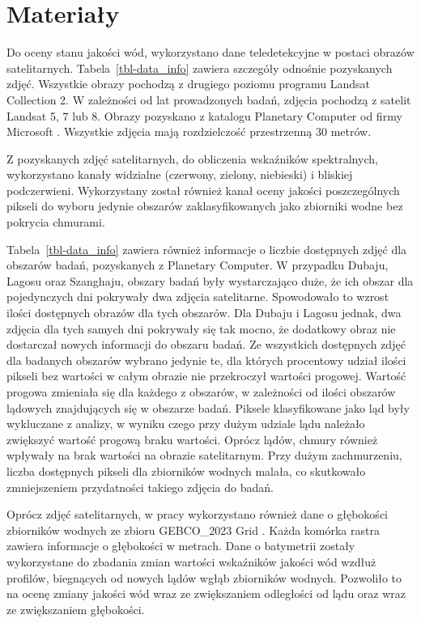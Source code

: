 \documentclass{amuthesis}
\begin{document}

\hypertarget{sec-materialy}{%
\chapter{Materiały}\label{sec-materialy}}

Do oceny stanu jakości wód, wykorzystano dane teledetekcyjne w postaci
obrazów satelitarnych. Tabela~\ref{tbl-data_info} zawiera szczegóły
odnośnie pozyskanych zdjęć. Wszystkie obrazy pochodzą z drugiego poziomu
programu Landsat Collection 2. W zależności od lat prowadzonych badań,
zdjęcia pochodzą z satelit Landsat 5, 7 lub 8. Obrazy pozyskano z
katalogu Planetary Computer od firmy Microsoft
\autocite{microsoft_open_source_2022_7261897}. Wszystkie zdjęcia mają
rozdzielczość przestrzenną 30 metrów.

Z pozyskanych zdjęć satelitarnych, do obliczenia wskaźników
spektralnych, wykorzystano kanały widzialne (czerwony, zielony,
niebieski) i bliskiej podczerwieni. Wykorzystany został również kanał
oceny jakości poszczególnych pikseli do wyboru jedynie obszarów
zaklasyfikowanych jako zbiorniki wodne bez pokrycia chmurami.

Tabela~\ref{tbl-data_info} zawiera również informacje o liczbie
dostępnych zdjęć dla obszarów badań, pozyskanych z Planetary Computer. W
przypadku Dubaju, Lagosu oraz Szanghaju, obszary badań były
wystarczająco duże, że ich obszar dla pojedynczych dni pokrywały dwa
zdjęcia satelitarne. Spowodowało to wzrost ilości dostępnych obrazów dla
tych obszarów. Dla Dubaju i Lagosu jednak, dwa zdjęcia dla tych samych
dni pokrywały się tak mocno, że dodatkowy obraz nie dostarczał nowych
informacji do obszaru badań. Ze wszystkich dostępnych zdjęć dla badanych
obszarów wybrano jedynie te, dla których procentowy udział ilości
pikseli bez wartości w całym obrazie nie przekroczył wartości progowej.
Wartość progowa zmieniała się dla każdego z obszarów, w zależności od
ilości obszarów lądowych znajdujących się w obszarze badań. Piksele
klasyfikowane jako ląd były wykluczane z analizy, w wyniku czego przy
dużym udziale lądu należało zwiększyć wartość progową braku wartości.
Oprócz lądów, chmury również wpływały na brak wartości na obrazie
satelitarnym. Przy dużym zachmurzeniu, liczba dostępnych pikseli dla
zbiorników wodnych malała, co skutkowało zmniejszeniem przydatności
takiego zdjęcia do badań.

Oprócz zdjęć satelitarnych, w pracy wykorzystano również dane o
głębokości zbiorników wodnych ze zbioru GEBCO\_2023 Grid
\autocite{gebco_2023}. Każda komórka rastra zawiera informacje o
głębokości w metrach. Dane o batymetrii zostały wykorzystane do zbadania
zmian wartości wskaźników jakości wód wzdłuż profilów, biegnących od
nowych lądów wgłąb zbiorników wodnych. Pozwoliło to na ocenę zmiany
jakości wód wraz ze zwiększaniem odległości od lądu oraz wraz ze
zwiększaniem głębokości.
\end{document}
